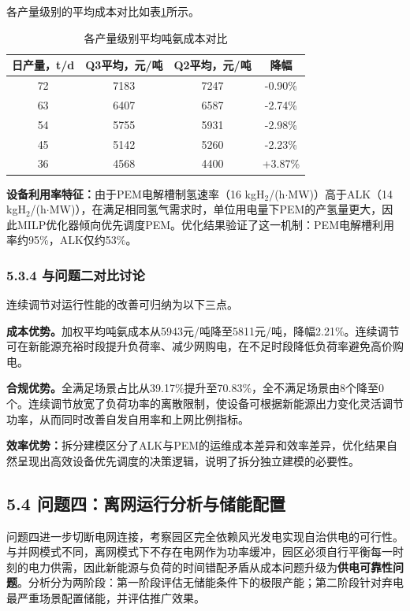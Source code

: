 \documentclass[zihao=-4,a4paper]{ctexart} %
\begin{document}
	各产量级别的平均成本对比如表\ref{tab:q3_levels}所示。
	
	\begin{table}[ht]
		\centering
		\caption{各产量级别平均吨氨成本对比}
		\label{tab:q3_levels}
		\begin{tabular}{cccc}
			\toprule
			日产量，t/d & Q3平均，元/吨 & Q2平均，元/吨 & 降幅 \\
			\midrule
			72 & 7183 & 7247 & -0.90\% \\
			63 & 6407 & 6587 & -2.74\% \\
			54 & 5755 & 5931 & -2.98\% \\
			45 & 5142 & 5260 & -2.23\% \\
			36 & 4568 & 4400 & +3.87\% \\
			\bottomrule
		\end{tabular}
	\end{table}
	
	\textbf{设备利用率特征：}由于PEM电解槽制氢速率（16 kgH$_2$/(h$\cdot$MW)）高于ALK（14 kgH$_2$/(h$\cdot$MW)），在满足相同氢气需求时，单位用电量下PEM的产氢量更大，因此MILP优化器倾向优先调度PEM。优化结果验证了这一机制：PEM电解槽利用率约95\%，ALK仅约53\%。
	
	\subsubsection*{5.3.4 与问题二对比讨论}
	
	连续调节对运行性能的改善可归纳为以下三点。
	
	\textbf{成本优势。}加权平均吨氨成本从5943元/吨降至5811元/吨，降幅2.21\%。连续调节可在新能源充裕时段提升负荷率、减少网购电，在不足时段降低负荷率避免高价购电。
	
	\textbf{合规优势。}全满足场景占比从39.17\%提升至70.83\%，全不满足场景由8个降至0个。连续调节放宽了负荷功率的离散限制，使设备可根据新能源出力变化灵活调节功率，从而同时改善自发自用率和上网比例指标。
	
	\textbf{效率优势：}拆分建模区分了ALK与PEM的运维成本差异和效率差异，优化结果自然呈现出高效设备优先调度的决策逻辑，说明了拆分独立建模的必要性。
	
	\subsection*{5.4 问题四：离网运行分析与储能配置}
	
	问题四进一步切断电网连接，考察园区完全依赖风光发电实现自治供电的可行性。与并网模式不同，离网模式下不存在电网作为功率缓冲，园区必须自行平衡每一时刻的电力供需，因此新能源与负荷的时间错配矛盾从成本问题升级为\textbf{供电可靠性问题}。分析分为两阶段：第一阶段评估无储能条件下的极限产能；第二阶段针对弃电最严重场景配置储能，并评估推广效果。
	
\end{document}
